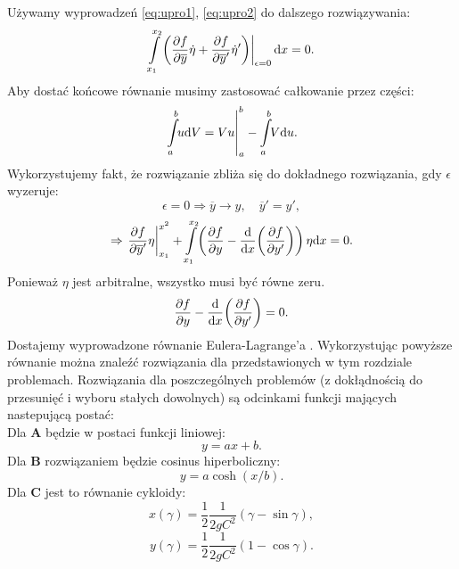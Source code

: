 Używamy wyprowadzeń \ref{eq:upro1}, \ref{eq:upro2} do dalszego rozwiązywania:
%
$$\int\limits_{x_1}^{x_2} \!\left.\left(\frac{\partial f}{\partial \overline{y}}\dot\eta+\frac{\partial f}{\partial \overline{y}'}\dot\eta '\right)\right|_{\epsilon=0}{\rm d}{x}=0.$$
%
Aby dostać końcowe równanie musimy zastosować całkowanie przez części: 
%
$$\left.\int\limits_{a}^{b}\!\!u{\rm d}{V}=Vu\right|_{a}^{b}-\int\limits_{a}^{b}\!\!V{\rm d}{u}.$$
%
Wykorzystujemy fakt, że rozwiązanie zbliża się do dokładnego rozwiązania, gdy $\epsilon$ wyzeruje:
%
$$\epsilon=0 \Rightarrow \overline{y}\rightarrow y,\quad\overline{y}'=y',$$
%
$$\Rightarrow \left.\frac{\partial f}{\partial \overline{y}'}\eta\right|_{x_1}^{x^2}+\int\limits_{x_1}^{x_2}\!\left(\frac{\partial f}{\partial y}-\frac{{\rm d}{}}{{\rm d}{x}}\!\left(\frac{\partial f}{\partial y'}\right)\right)\eta {\rm d}{x}=0.$$
%
Ponieważ $\eta$ jest arbitralne, wszystko musi być równe zeru.
%
$$\frac{\partial f}{\partial y}-\frac{{\rm d}{}}{{\rm d}{x}}\!\left(\frac{\partial f}{\partial y'}\right)=0.$$
%
Dostajemy wyprowadzone równanie Eulera-Lagrange’a \cite{gregoryundersen}. Wykorzystując powyższe równanie można znaleźć rozwiązania dla przedstawionych w tym rozdziale problemach. Rozwiązania dla poszczególnych problemów (z dokłądnością do przesunięć i wyboru stałych dowolnych) są odcinkami funkcji mających nastepującą postać:\\
Dla {\bf A} będzie w postaci funkcji liniowej:
$$y=ax+b.$$
Dla {\bf B} rozwiązaniem będzie cosinus hiperboliczny:
$$y =a \cosh(x/b).$$
Dla {\bf C} jest to równanie cykloidy:
$$x(\gamma)=\frac{1}{2}\frac{1}{2gC^2}(\gamma-\sin{\gamma}),$$
$$y(\gamma)=\frac{1}{2}\frac{1}{2gC^2}(1-\cos{\gamma}).$$